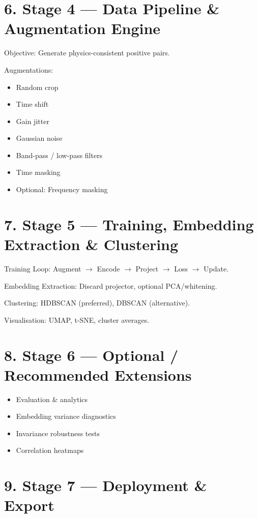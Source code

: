 \documentclass[11pt,a4paper]{article}
\begin{document}
\section*{6. Stage 4 — Data Pipeline \& Augmentation Engine}

Objective: Generate physics-consistent positive pairs.

Augmentations:
\begin{itemize}
\item Random crop
\item Time shift
\item Gain jitter
\item Gaussian noise
\item Band-pass / low-pass filters
\item Time masking
\item Optional: Frequency masking
\end{itemize}

\section*{7. Stage 5 — Training, Embedding Extraction \& Clustering}

Training Loop: Augment $\rightarrow$ Encode $\rightarrow$ Project $\rightarrow$ Loss $\rightarrow$ Update.

Embedding Extraction: Discard projector, optional PCA/whitening.

Clustering: HDBSCAN (preferred), DBSCAN (alternative).

Visualisation: UMAP, t-SNE, cluster averages.

\section*{8. Stage 6 — Optional / Recommended Extensions}

\begin{itemize}
\item Evaluation \& analytics
\item Embedding variance diagnostics
\item Invariance robustness tests
\item Correlation heatmaps
\end{itemize}

\section*{9. Stage 7 — Deployment \& Export}
\end{document}
